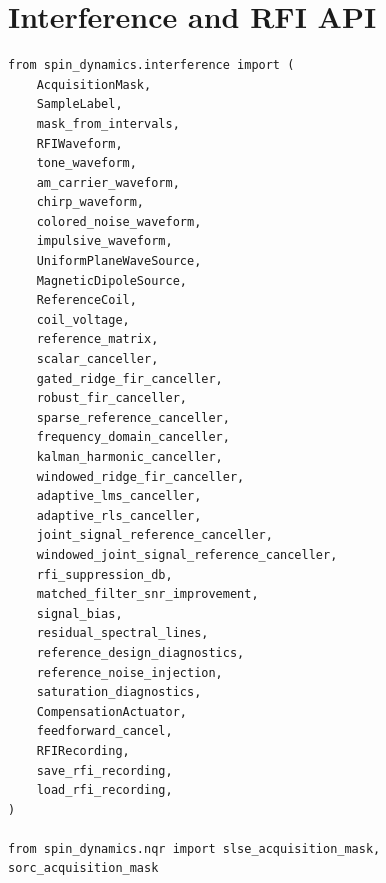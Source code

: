 \documentclass[11pt,oneside]{report}
\begin{document}
\section{Interference and RFI API}

\begin{lstlisting}
from spin_dynamics.interference import (
    AcquisitionMask,
    SampleLabel,
    mask_from_intervals,
    RFIWaveform,
    tone_waveform,
    am_carrier_waveform,
    chirp_waveform,
    colored_noise_waveform,
    impulsive_waveform,
    UniformPlaneWaveSource,
    MagneticDipoleSource,
    ReferenceCoil,
    coil_voltage,
    reference_matrix,
    scalar_canceller,
    gated_ridge_fir_canceller,
    robust_fir_canceller,
    sparse_reference_canceller,
    frequency_domain_canceller,
    kalman_harmonic_canceller,
    windowed_ridge_fir_canceller,
    adaptive_lms_canceller,
    adaptive_rls_canceller,
    joint_signal_reference_canceller,
    windowed_joint_signal_reference_canceller,
    rfi_suppression_db,
    matched_filter_snr_improvement,
    signal_bias,
    residual_spectral_lines,
    reference_design_diagnostics,
    reference_noise_injection,
    saturation_diagnostics,
    CompensationActuator,
    feedforward_cancel,
    RFIRecording,
    save_rfi_recording,
    load_rfi_recording,
)

from spin_dynamics.nqr import slse_acquisition_mask, sorc_acquisition_mask
\end{lstlisting}
\end{document}
